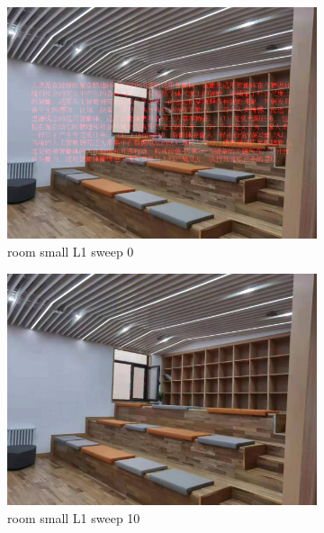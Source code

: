 \documentclass[11pt]{article}
\begin{document}
\begin{figure}[ht!]
    \centering
    \hfill%
    \begin{subfigure}[]{0.333\linewidth}
        \centering
        \includegraphics[width=\linewidth]{fig/restoration/room_small/L1/gibbs_0.jpg}
        \caption{room small L1 sweep 0}
    \end{subfigure}%
    \hfill%
    \begin{subfigure}[]{0.333\linewidth}
        \centering
        \includegraphics[width=\linewidth]{fig/restoration/room_small/L1/gibbs_10.jpg}
        \caption{room small L1 sweep 10}
    \end{subfigure}%
    \hfill%
    \begin{subfigure}[]{0.333\linewidth}

\end{subfigure}
\end{figure}
\end{document}
